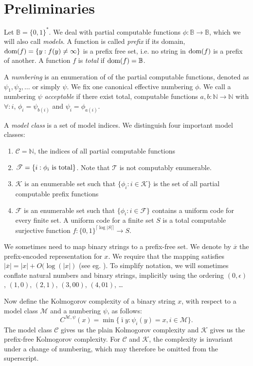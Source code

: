 \documentclass{style/llncs}
\newcommand{\M}{\mathscr M}
\newcommand{\C}{\mathscr C}
\newcommand{\T}{\mathscr T}
\newcommand{\F}{\mathscr F}
\newcommand{\K}{\mathscr K}
\newcommand{\B}{\mathbb B}
\newcommand{\N}{\mathbb N}
\newcommand{\tn}[1]{\textnormal{#1}}
\newcommand{\br}[1]{\overline{#1}}
\newcommand{\dom}[1]{\mathop{\tn{dom}(#1)}}
\begin{document}
\section{Preliminaries}
Let $\B = \{0,1\}^*$. We deal with partial computable functions $\phi: \B \to \B$, which we will also call \emph{models}. A function is called \emph{prefix} if its domain, $\dom{f} = \{y : f(y) \neq \infty\}$ is a prefix free set, i.e. no string in $\dom{f}$ is a prefix of another. A function $f$ is \emph{total} if $\dom{f} = \B$.

A \emph{numbering} is an enumeration of of the partial computable functions, denoted as $\psi_1, \psi_2, \ldots$ or simply $\psi$. We fix one canonical effective numbering $\phi$. We call a numbering $\psi$ \emph{acceptable} if there exist total, computable functions $a, b: \N \to \N$ with $\forall: i$, $\phi_i = \psi_{b(i)}$ and  $\psi_i = \phi_{a(i)}$.

A \emph{model class} is a set of model indices. We distinguish four important model classes: 
\begin{enumerate}
\item $\C=\N$, the indices of all partial computable functions
\item $\T=\{i:\tn{$\phi_i$ is total}\}$. Note that $\T$ is not computably enumerable.
\item $\K$ is an enumerable set such that $\{\phi_i:i\in\K\}$ is the set of all partial computable prefix functions
\item $\F$ is an enumerable set such that $\{\phi_i:i\in\F\}$ contains a uniform code for every finite set. A uniform code for a finite set $S$ is a total computable surjective function $f:\{0,1\}^{\lceil\log|S|\rceil}\to S$.
\end{enumerate}
We sometimes need to map binary strings to a prefix-free set. We denote by $\br{x}$ the prefix-encoded representation for $x$. We require that the mapping satisfies $|\br{x}| = |x|+O(\log(|x|)$ (see eg. \cite[Section~1.4]{li1993introduction}). To simplify notation, we will sometimes conflate natural numbers and binary strings, implicitly using the ordering $(0, \epsilon)$, $(1, 0)$, $(2, 1)$, $(3, 00)$, $(4, 01)$, \ldots

Now define the Kolmogorov complexity of a binary string $x$, with respect to a model class $\M$ and a numbering $\psi$, as follows:
\[
C^{\M,\psi}(x)=\min\{\bar\imath y:\psi_i(y)=x,i\in\M\}.
\]
The model class $\C$ gives us the plain Kolmogorov complexity and $\K$ gives us the prefix-free Kolmogorov complexity. For $\C$ and $\K$, the complexity is invariant under a change of numbering, which may therefore be omitted from the superscript.
\end{document}
